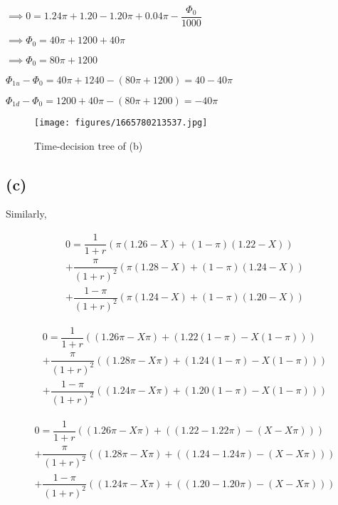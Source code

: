 \documentclass{article}
\begin{document}
$\implies0=1.24\pi+1.20-1.20\pi+0.04\pi-\dfrac{\Phi_{0}}{1000}$

$\implies\Phi_{0}=40\pi+1200+40\pi$

$\implies\boxed{\Phi_{0}=80\pi+1200}$

$\Phi_{1u}-\Phi_{0}=40\pi+1240-\left(80\pi+1200\right)=40-40\pi$

$\Phi_{1d}-\Phi_{0}=1200+40\pi-\left(80\pi+1200\right)=-40\pi$

\begin{figure}[H]
    \begin{center}
        \texttt{[image: figures/1665780213537.jpg]}
    \end{center}
    \caption{Time-decision tree of (b)}
    \label{fig:graph}
\end{figure}

\subsection*{(c)}

Similarly,

\begin{multline*}
    0=\dfrac{1}{1+r}\left(\pi\left(1.26-X\right)+\left(1-\pi\right)\left(1.22-X\right)\right)\\
    +\dfrac{\pi}{\left(1+r\right)^{2}}\left(\pi\left(1.28-X\right)+\left(1-\pi\right)\left(1.24-X\right)\right)\\
    +\dfrac{1-\pi}{\left(1+r\right)^{2}}\left(\pi\left(1.24-X\right)+\left(1-\pi\right)\left(1.20-X\right)\right)
\end{multline*}

\begin{multline*}
    0=\dfrac{1}{1+r}\left(\left(1.26\pi-X\pi\right)+\left(1.22\left(1-\pi\right)-X\left(1-\pi\right)\right)\right)\\
    +\dfrac{\pi}{\left(1+r\right)^{2}}\left(\left(1.28\pi-X\pi\right)+\left(1.24\left(1-\pi\right)-X\left(1-\pi\right)\right)\right)\\
    +\dfrac{1-\pi}{\left(1+r\right)^{2}}\left(\left(1.24\pi-X\pi\right)+\left(1.20\left(1-\pi\right)-X\left(1-\pi\right)\right)\right)
\end{multline*}

\begin{multline*}
    0=\dfrac{1}{1+r}\left(\left(1.26\pi-X\pi\right)+\left(\left(1.22-1.22\pi\right)-\left(X-X\pi\right)\right)\right)\\
    +\dfrac{\pi}{\left(1+r\right)^{2}}\left(\left(1.28\pi-X\pi\right)+\left(\left(1.24-1.24\pi\right)-\left(X-X\pi\right)\right)\right)\\
    +\dfrac{1-\pi}{\left(1+r\right)^{2}}\left(\left(1.24\pi-X\pi\right)+\left(\left(1.20-1.20\pi\right)-\left(X-X\pi\right)\right)\right)
\end{multline*}
\end{document}
